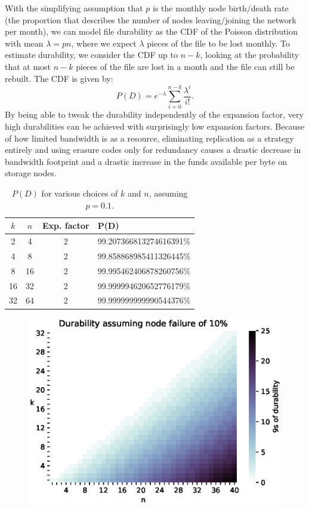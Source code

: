 \documentclass[a4paper,10pt]{article} \usepackage[utf8]{inputenc}
\begin{document}
With the simplifying assumption that $p$ is the monthly node 
birth/death rate (the proportion that describes the number of nodes
leaving/joining the network per month), we can model file durability 
as the CDF of the Poisson distribution with mean $\lambda=pn$, 
where we expect $\lambda$ pieces of the file to be lost monthly. To estimate 
durability, we consider the CDF up to $n-k$, 
looking at the probability that at most $n-k$ pieces 
of the file are lost in a month and the file can still be rebuilt.
The CDF is given by:
\begin{equation} 
P(D) = e^{-\lambda} \sum_{i=0}^{n-k} \frac{\lambda^i}{i!}.
\label{eq:poiss_cdf}
\end{equation}
By being able to tweak the durability independently of the expansion factor,
very high durabilities can be achieved with surprisingly low expansion factors.
Because of how limited bandwidth is as a resource, eliminating replication as a
strategy entirely and using erasure codes only for redundancy causes a drastic
decrease in bandwidth footprint and a drastic increase in the funds available
per byte on storage nodes.


\begin{table}[h]
\centering
\begin{tabular}{c c c l}
$k$ & $n$ & Exp. factor & P(D) \\
\hline 2 & 4 & 2 & 99.207366813274616391\%\\
4 & 8 & 2 & 99.858868985411326445\%\\
8 & 16 & 2 & 99.995462406878260756\%\\
16 & 32 & 2 & 99.999994620652776179\%\\
32 & 64 & 2 & 99.999999999990544376\%\\
\end{tabular}
\caption{$P(D)$ for various choices of $k$ and $n$, assuming $p=0.1$.}
\end{table}

\begin{figure} \centering
\includegraphics[width=\linewidth]{durability/durability.eps}
\label{fig:durability}
\end{figure}
\end{document}
